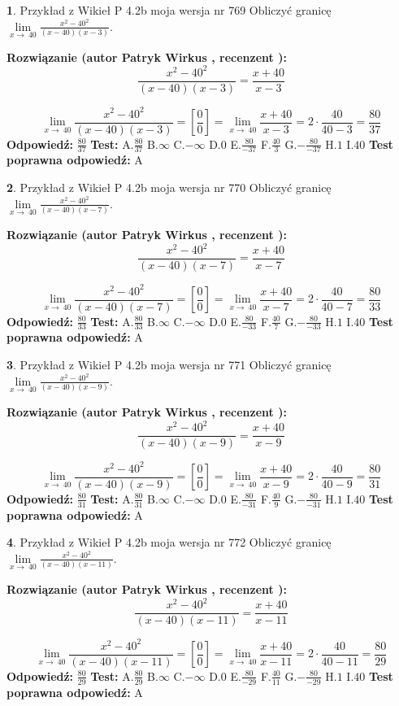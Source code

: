 \documentclass[12pt, a4paper]{article}
\theoremstyle{definition} %
\newtheorem{zad}{}
\newcommand{\zadStart}[1]{\begin{zad}#1\newline}
\newcommand{\zadStop}{\end{zad}}
\newcommand{\rozwStart}[2]{\noindent \textbf{Rozwiązanie (autor #1 , recenzent #2): }\newline}
\newcommand{\rozwStop}{\newline}
\newcommand{\odpStart}{\noindent \textbf{Odpowiedź:}\newline}
\newcommand{\odpStop}{\newline}
\newcommand{\testStart}{\noindent \textbf{Test:}\newline}
\newcommand{\testStop}{\newline}
\newcommand{\kluczStart}{\noindent \textbf{Test poprawna odpowiedź:}\newline}
\newcommand{\kluczStop}{\newline}
\begin{document}
\zadStart{Przykład z Wikieł P 4.2b moja wersja nr 769}
Obliczyć granicę $\lim\limits_{x\to\ 40}\frac{x^{2}-40^{2}}{(x-40)(x-3)}$.
\zadStop
\rozwStart{Patryk Wirkus}{}
$$\frac{x^{2}-40^{2}}{(x-40)(x-3)}=\frac{x+40}{x-3}$$

$$\lim\limits_{x\to\ 40}\frac{x^{2}-40^{2}}{(x-40)(x-3)}=[\frac{0}{0}]=\lim\limits_{x\to\ 40}\frac{x+40}{x-3}=2 \cdot \frac{40}{40-3} = \frac{80}{37}$$
\rozwStop
\odpStart
$\frac{80}{37}$
\odpStop
\testStart
A.$\frac{80}{37}$
B.$\infty$
C.$-\infty$
D.$0$
E.$\frac{80}{-37}$
F.$\frac{40}{3}$
G.$-\frac{80}{-37}$
H.$1$
I.$40$
\testStop
\kluczStart
A
\kluczStop



\zadStart{Przykład z Wikieł P 4.2b moja wersja nr 770}
Obliczyć granicę $\lim\limits_{x\to\ 40}\frac{x^{2}-40^{2}}{(x-40)(x-7)}$.
\zadStop
\rozwStart{Patryk Wirkus}{}
$$\frac{x^{2}-40^{2}}{(x-40)(x-7)}=\frac{x+40}{x-7}$$

$$\lim\limits_{x\to\ 40}\frac{x^{2}-40^{2}}{(x-40)(x-7)}=[\frac{0}{0}]=\lim\limits_{x\to\ 40}\frac{x+40}{x-7}=2 \cdot \frac{40}{40-7} = \frac{80}{33}$$
\rozwStop
\odpStart
$\frac{80}{33}$
\odpStop
\testStart
A.$\frac{80}{33}$
B.$\infty$
C.$-\infty$
D.$0$
E.$\frac{80}{-33}$
F.$\frac{40}{7}$
G.$-\frac{80}{-33}$
H.$1$
I.$40$
\testStop
\kluczStart
A
\kluczStop



\zadStart{Przykład z Wikieł P 4.2b moja wersja nr 771}
Obliczyć granicę $\lim\limits_{x\to\ 40}\frac{x^{2}-40^{2}}{(x-40)(x-9)}$.
\zadStop
\rozwStart{Patryk Wirkus}{}
$$\frac{x^{2}-40^{2}}{(x-40)(x-9)}=\frac{x+40}{x-9}$$

$$\lim\limits_{x\to\ 40}\frac{x^{2}-40^{2}}{(x-40)(x-9)}=[\frac{0}{0}]=\lim\limits_{x\to\ 40}\frac{x+40}{x-9}=2 \cdot \frac{40}{40-9} = \frac{80}{31}$$
\rozwStop
\odpStart
$\frac{80}{31}$
\odpStop
\testStart
A.$\frac{80}{31}$
B.$\infty$
C.$-\infty$
D.$0$
E.$\frac{80}{-31}$
F.$\frac{40}{9}$
G.$-\frac{80}{-31}$
H.$1$
I.$40$
\testStop
\kluczStart
A
\kluczStop



\zadStart{Przykład z Wikieł P 4.2b moja wersja nr 772}
Obliczyć granicę $\lim\limits_{x\to\ 40}\frac{x^{2}-40^{2}}{(x-40)(x-11)}$.
\zadStop
\rozwStart{Patryk Wirkus}{}
$$\frac{x^{2}-40^{2}}{(x-40)(x-11)}=\frac{x+40}{x-11}$$

$$\lim\limits_{x\to\ 40}\frac{x^{2}-40^{2}}{(x-40)(x-11)}=[\frac{0}{0}]=\lim\limits_{x\to\ 40}\frac{x+40}{x-11}=2 \cdot \frac{40}{40-11} = \frac{80}{29}$$
\rozwStop
\odpStart
$\frac{80}{29}$
\odpStop
\testStart
A.$\frac{80}{29}$
B.$\infty$
C.$-\infty$
D.$0$
E.$\frac{80}{-29}$
F.$\frac{40}{11}$
G.$-\frac{80}{-29}$
H.$1$
I.$40$
\testStop
\kluczStart
A
\kluczStop
\end{document}
